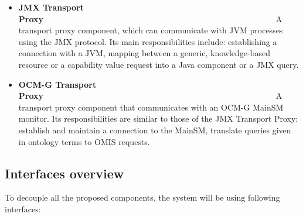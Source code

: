 \begin{itemize}
\item {\bf JMX Transport Proxy}~~~~~~~~~~~~~~~~~~~~~~~~~~~~~~~~~~~~~~~~~~~~~~~~~~~~~~~~\linebreak
A transport proxy component, which can communicate with JVM processes using the JMX protocol. Its main responsibilities include: establishing a connection with a JVM, mapping between a generic, knowledge-based resource or a capability value request into a Java component or a JMX query.

\item {\bf OCM-G Transport Proxy}~~~~~~~~~~~~~~~~~~~~~~~~~~~~~~~~~~~~~~~~~~~~~~~~~~~~~~~~\linebreak
A transport proxy component that communicates with an OCM-G MainSM monitor. Its responsibilities are similar to those of the JMX Transport Proxy: establish and maintain a connection to the MainSM, translate queries given in ontology terms to OMIS requests.

\end{itemize}

\subsection{Interfaces overview}

To decouple all the proposed components, the system will be using following interfaces:

